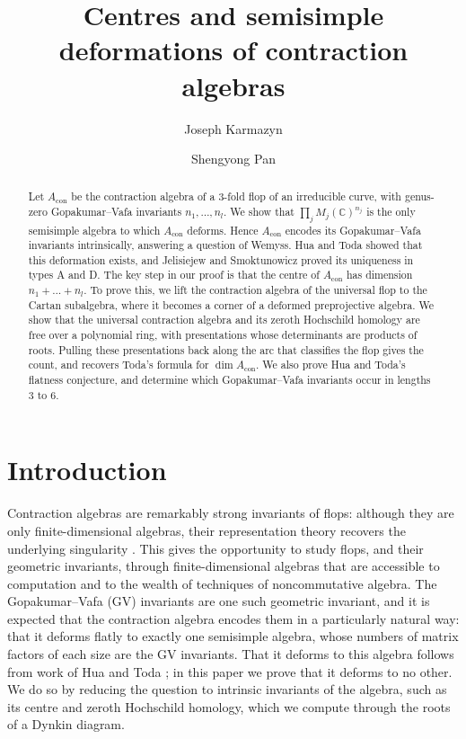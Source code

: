 \documentclass[11pt]{amsart}
\title[Centres of contraction algebras]{Centres and semisimple deformations of contraction algebras}
\author{Joseph Karmazyn}
\author{Shengyong Pan}
\date{}
\numberwithin{table}{section}
\numberwithin{figure}{section}
\numberwithin{equation}{section}
\theoremstyle{definition}
\theoremstyle{plain}
\begin{document}
\begin{abstract}
Let $A_{\mathrm{con}}$ be the contraction algebra of a $3$-fold flop of an irreducible curve, with genus-zero Gopakumar--Vafa invariants $n_1, \dots, n_l$. We show that $\prod_j M_j(\mathbb{C})^{n_j}$ is the only semisimple algebra to which $A_{\mathrm{con}}$ deforms. Hence $A_{\mathrm{con}}$ encodes its Gopakumar--Vafa invariants intrinsically, answering a question of Wemyss. Hua and Toda showed that this deformation exists, and Jelisiejew and Smoktunowicz proved its uniqueness in types A and D. The key step in our proof is that the centre of $A_{\mathrm{con}}$ has dimension $n_1 + \dots + n_l$. To prove this, we lift the contraction algebra of the universal flop to the Cartan subalgebra, where it becomes a corner of a deformed preprojective algebra. We show that the universal contraction algebra and its zeroth Hochschild homology are free over a polynomial ring, with presentations whose determinants are products of roots. Pulling these presentations back along the arc that classifies the flop gives the count, and recovers Toda's formula for $\dim A_{\mathrm{con}}$. We also prove Hua and Toda's flatness conjecture, and determine which Gopakumar--Vafa invariants occur in lengths $3$ to $6$.
\end{abstract}

\maketitle

%
\section{Introduction}\label{sec:intro}

Contraction algebras are remarkably strong invariants of flops: although they are only finite-dimensional algebras, their representation theory recovers the underlying singularity \cite{HK, JKM, KLW}. This gives the opportunity to study flops, and their geometric invariants, through finite-dimensional algebras that are accessible to computation and to the wealth of techniques of noncommutative algebra. The Gopakumar--Vafa (GV) invariants are one such geometric invariant, and it is expected that the contraction algebra encodes them in a particularly natural way: that it deforms flatly to exactly one semisimple algebra, whose numbers of matrix factors of each size are the GV invariants. That it deforms to this algebra follows from work of Hua and Toda \cite{HT}; in this paper we prove that it deforms to no other. We do so by reducing the question to intrinsic invariants of the algebra, such as its centre and zeroth Hochschild homology, which we compute through the roots of a Dynkin diagram.
\end{document}
